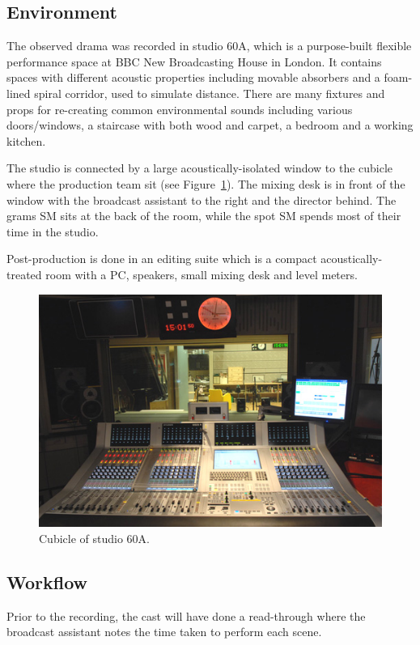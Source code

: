 \subsection{Environment}
The observed drama was recorded in studio 60A, which is a purpose-built
flexible performance space at BBC New Broadcasting House in London. It contains 
spaces with different acoustic properties including movable absorbers and a
foam-lined spiral corridor, used to simulate distance. There are many fixtures
and props for re-creating common environmental sounds including various
doors/windows, a staircase with both wood and carpet, a bedroom and a working
kitchen.

The studio is connected by a large acoustically-isolated window to the cubicle
where the production team sit (see Figure~\ref{fig:drama-studio}). The mixing
desk is in front of the window with the broadcast assistant to the right and
the director behind. The grams SM sits at the back of the room, while the spot
SM spends most of their time in the studio.

Post-production is done in an editing suite which is a compact
acoustically-treated room with a PC, speakers, small mixing desk and level
meters.

\begin{figure}[ht]
  \centering
  \includegraphics[width=\columnwidth]{figs/60a.jpg}
  \caption{Cubicle of studio 60A.}
  \label{fig:drama-studio}
\end{figure}

\subsection{Workflow}
Prior to the recording, the cast will have done a read-through where the
broadcast assistant notes the time taken to perform each scene.

